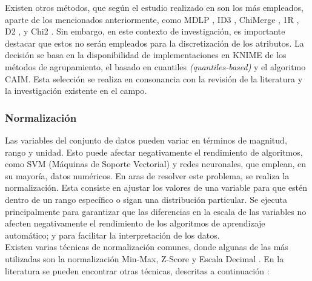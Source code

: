 Existen otros métodos, que según el estudio realizado en \citep{garcia2012survey} son los más empleados, aparte de los mencionados anteriormente, como MDLP \citep{FI1993}, ID3 \citep{quinlan1993c}, ChiMerge \citep{K1992}, 1R \citep{holte1993very}, D2 \citep{catlett1991changing}, y Chi2 \citep{liu1997feature}. Sin embargo, en este contexto de investigación, es importante destacar que estos no serán empleados para la discretización de los atributos. La decisión se basa en la disponibilidad de implementaciones en KNIME de los métodos de agrupamiento, el basado en cuantiles \textit{(quantiles-based)} y el algoritmo CAIM. Esta selección se realiza en consonancia con la revisión de la literatura y la investigación existente en el campo.

\subsubsection*{Normalización}
Las variables del conjunto de datos pueden variar en términos de magnitud, rango y unidad. Esto puede afectar negativamente el rendimiento de algoritmos, como SVM (Máquinas de Soporte Vectorial) y redes neuronales, que emplean, en su mayoría, datos numéricos. En aras de resolver este problema, se realiza la normalización. Esta consiste  en ajustar los valores de una variable para que estén dentro de un rango específico o sigan una distribución particular. Se ejecuta principalmente para garantizar que las diferencias en la escala de las variables no afecten negativamente el rendimiento de los algoritmos de aprendizaje automático; y para facilitar la interpretación de los datos.\\
Existen varias técnicas de normalización comunes, donde algunas de las más utilizadas son la normalización Min-Max, Z-Score y Escala Decimal \citep{garcia2015data}. En la literatura se pueden encontrar otras técnicas, descritas a continuación \citep{garcia2015data}:
